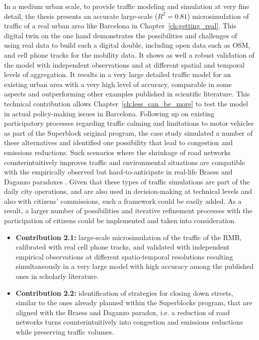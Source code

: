 In a medium urban scale, to provide traffic modeling and simulation at very fine detail, the thesis presents an accurate large-scale ($R^2=0.81$) microsimulation of traffic of a real urban area like Barcelona in Chapter~\ref{ch:getting_real}. This digital twin on the one hand demonstrates the possibilities and challenges of using real data to build such a digital double, including open data such as OSM, and cell phone tracks for the mobility data. It shows as well a robust validation of the model with independent observations and at different spatial and temporal levels of aggregation. It results in a very large detailed traffic model for an existing urban area with a very high level of accuracy, comparable in some aspects and outperforming other examples published in scientific literature. This technical contribution allows Chapter~\ref{ch:less_can_be_more} to test the model in actual policy-making issues in Barcelona. Following up on existing participatory processes regarding traffic calming and limitations to motor vehicles as part of the Superblock original program, the case study simulated a number of these alternatives and identified one possibility that lead to congestion and emissions reductions. Such scenarios where the shrinkage of road networks counterintuitively improves traffic and environmental situations are compatible with the empirically observed but hard-to-anticipate in real-life Braess and Daganzo paradoxes \citep{Braess1969,Sheffi1978}. Given that these types of traffic simulations are part of the daily city operations, and are also used in decision-making at technical levels and also with citizens' commissions, such a framework could be easily added. As a result, a larger number of possibilities and iterative refinement processes with the participation of citizens could be implemented and taken into consideration. 

\begin{itemize}
    \item \textbf{Contribution 2.1:} large-scale microsimulation of the traffic of the RMB, calibrated with real cell phone tracks, and validated with independent empirical observations at different spatio-temporal resolutions resulting simultaneously in a very large model with high accuracy among the published ones in scholarly literature.
    \item \textbf{Contribution 2.2:} identification of strategies for closing down streets, similar to the ones already planned within the Superblocks program, that are aligned with the Braess and Daganzo paradox, i.e. a reduction of road networks turns counterintuitively into congestion and emissions reductions while preserving traffic volumes. 
\end{itemize}

